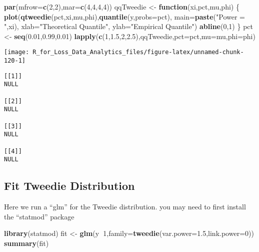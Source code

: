 \documentclass[]{book}
\newenvironment{Shaded}{\begin{snugshade}}{\end{snugshade}}
\newcommand{\KeywordTok}[1]{\textcolor[rgb]{0.13,0.29,0.53}{\textbf{#1}}}
\newcommand{\DataTypeTok}[1]{\textcolor[rgb]{0.13,0.29,0.53}{#1}}
\newcommand{\DecValTok}[1]{\textcolor[rgb]{0.00,0.00,0.81}{#1}}
\newcommand{\FloatTok}[1]{\textcolor[rgb]{0.00,0.00,0.81}{#1}}
\newcommand{\StringTok}[1]{\textcolor[rgb]{0.31,0.60,0.02}{#1}}
\newcommand{\ControlFlowTok}[1]{\textcolor[rgb]{0.13,0.29,0.53}{\textbf{#1}}}
\newcommand{\OperatorTok}[1]{\textcolor[rgb]{0.81,0.36,0.00}{\textbf{#1}}}
\newcommand{\NormalTok}[1]{#1}
\theoremstyle{definition}
\theoremstyle{definition}
\theoremstyle{definition}
\theoremstyle{remark}
\begin{document}
\begin{Shaded}
\begin{Highlighting}[]
\KeywordTok{par}\NormalTok{(}\DataTypeTok{mfrow=}\KeywordTok{c}\NormalTok{(}\DecValTok{2}\NormalTok{,}\DecValTok{2}\NormalTok{),}\DataTypeTok{mar=}\KeywordTok{c}\NormalTok{(}\DecValTok{4}\NormalTok{,}\DecValTok{4}\NormalTok{,}\DecValTok{4}\NormalTok{,}\DecValTok{4}\NormalTok{))}
\NormalTok{qqTweedie <-}\StringTok{ }\ControlFlowTok{function}\NormalTok{(xi,pct,mu,phi) \{}
  \KeywordTok{plot}\NormalTok{(}\KeywordTok{qtweedie}\NormalTok{(pct,xi,mu,phi),}\KeywordTok{quantile}\NormalTok{(y,}\DataTypeTok{probs=}\NormalTok{pct),}
       \DataTypeTok{main=}\KeywordTok{paste}\NormalTok{(}\StringTok{"Power = "}\NormalTok{,xi), }\DataTypeTok{xlab=}\StringTok{"Theoretical Quantile"}\NormalTok{, }\DataTypeTok{ylab=}\StringTok{"Empirical Quantile"}\NormalTok{)}
  \KeywordTok{abline}\NormalTok{(}\DecValTok{0}\NormalTok{,}\DecValTok{1}\NormalTok{)}
\NormalTok{\}}
\NormalTok{pct <-}\StringTok{ }\KeywordTok{seq}\NormalTok{(}\FloatTok{0.01}\NormalTok{,}\FloatTok{0.99}\NormalTok{,}\FloatTok{0.01}\NormalTok{)}
\KeywordTok{lapply}\NormalTok{(}\KeywordTok{c}\NormalTok{(}\DecValTok{1}\NormalTok{,}\FloatTok{1.5}\NormalTok{,}\DecValTok{2}\NormalTok{,}\FloatTok{2.5}\NormalTok{),qqTweedie,}\DataTypeTok{pct=}\NormalTok{pct,}\DataTypeTok{mu=}\NormalTok{mu,}\DataTypeTok{phi=}\NormalTok{phi)}
\end{Highlighting}
\end{Shaded}

\begin{center}\texttt{[image: R\_for\_Loss\_Data\_Analytics\_files/figure-latex/unnamed-chunk-120-1]} \end{center}

\begin{verbatim}
[[1]]
NULL

[[2]]
NULL

[[3]]
NULL

[[4]]
NULL
\end{verbatim}

\subsection{Fit Tweedie Distribution}\label{fit-tweedie-distribution}

Here we run a ``glm'' for the Tweedie distribution. you may need to
first install the ``statmod'' package

\begin{Shaded}
\begin{Highlighting}[]
\KeywordTok{library}\NormalTok{(statmod)}
\NormalTok{fit <-}\StringTok{ }\KeywordTok{glm}\NormalTok{(y}\OperatorTok{~}\DecValTok{1}\NormalTok{,}\DataTypeTok{family=}\KeywordTok{tweedie}\NormalTok{(}\DataTypeTok{var.power=}\FloatTok{1.5}\NormalTok{,}\DataTypeTok{link.power=}\DecValTok{0}\NormalTok{))}
\KeywordTok{summary}\NormalTok{(fit)}
\end{Highlighting}
\end{Shaded}
\end{document}
